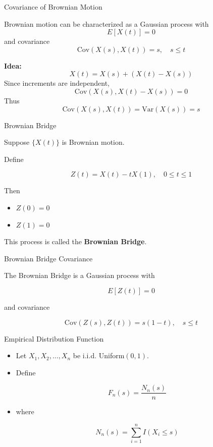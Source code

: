 \documentclass{beamer}
\begin{document}
\begin{frame}{Covariance of Brownian Motion}

Brownian motion can be characterized as a Gaussian process with
\[
E[X(t)] = 0
\]
and covariance
\[
\text{Cov}(X(s),X(t)) = s, \quad s \le t
\]

\textbf{Idea:}
\[
X(t) = X(s) + (X(t)-X(s))
\]
Since increments are independent,
\[
\text{Cov}(X(s),X(t)-X(s)) = 0
\]
Thus
\[
\text{Cov}(X(s),X(t)) = \text{Var}(X(s)) = s
\]
\end{frame}
\begin{frame}{Brownian Bridge}

Suppose $\{X(t)\}$ is Brownian motion.

\pause

Define

\[
Z(t) = X(t) - tX(1), \quad 0 \le t \le 1
\]

\pause

Then

\begin{itemize}[<+->]
\item $Z(0)=0$
\item $Z(1)=0$
\end{itemize}

\pause

This process is called the \textbf{Brownian Bridge}.

\end{frame}

\begin{frame}{Brownian Bridge Covariance}

\pause

The Brownian Bridge is a Gaussian process with

\[
E[Z(t)] = 0
\]

\pause

and covariance

\[
\text{Cov}(Z(s),Z(t)) = s(1-t), \quad s \le t
\]

\end{frame}
\begin{frame}{Empirical Distribution Function}

\begin{itemize}[<+->]

\item Let $X_1,X_2,\dots,X_n$ be i.i.d. Uniform$(0,1)$.

\item Define

\[
F_n(s) = \frac{N_n(s)}{n}
\]

\item where

\[
N_n(s) = \sum_{i=1}^n I(X_i \le s)
\]

\end{itemize}

\end{frame}
\end{document}
